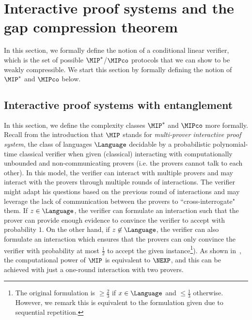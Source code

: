 \section{Interactive proof systems and the gap compression theorem} \label{sec:MIPcompressibility}
In this section, we formally define the notion of a conditional linear verifier, which is the set of possible $\MIP^*$/$\MIPco$ protocols that we can show to be weakly compressible. We start this section by formally defining the notion of $\MIP^*$ and $\MIPco$ below.

\subsection{Interactive proof systems with entanglement}
In this section, we define the complexity classes $\MIP^*$ and $\MIPco$ more formally. Recall from the introduction that $\MIP$ stands for \textit{multi-prover interactive proof system}, the class of languages $\Language$ decidable by a probabilistic polynomial-time classical verifier when given (classical) interacting with computationally unbounded and non-communicating provers (i.e. the provers cannot talk to each other). In this model, the verifier can interact with multiple provers and may interact with the provers through multiple rounds of interactions. The verifier might adapt his questions based on the previous round of interactions and may leverage the lack of communication between the provers to ``cross-interrogate" them. If $z \in \Language$, the verifier can formulate an interaction such that the prover can provide enough evidence to convince the verifier to accept with probability $1$. On the other hand, if $z \not\in \Language$, the verifier can also formulate an interaction which ensures that the provers can only convince the verifier with probability at most $\frac{1}{2}$ to accept the given instance\footnote{The original formulation is $\geq \frac{2}{3}$ if $x \in \Language$ and $\leq \frac{1}{3}$ otherwise. However, we remark this is equivalent to the formulation given due to sequential repetition.}). As shown in~\cite{babaiNondeterministicExponentialTime1991a}, the computational power of $\MIP$ is equivalent to $\NEXP$, and this can be achieved with just a one-round interaction with two provers. 

